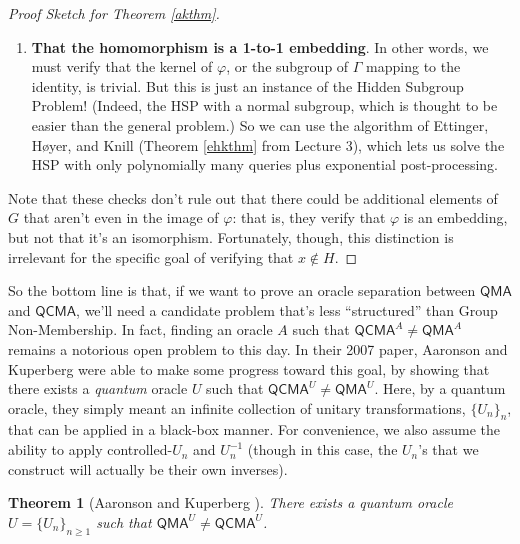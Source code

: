 \documentclass[11pt]{report}
\theoremstyle{plain}
\newtheorem{theorem}{Theorem}[section]
\theoremstyle{definition}
\begin{document}
\begin{proof}[Proof Sketch for Theorem \ref{akthm}]
\begin{enumerate}
    \item   \textbf{That the homomorphism is a 1-to-1 embedding}.  In other words, we must verify that the kernel of $\varphi$, or the subgroup of $\Gamma$ mapping to the identity, is trivial.  But this is just an instance of the Hidden Subgroup Problem!  (Indeed, the HSP with a normal subgroup, which is thought to be easier than the general problem.)  So
        we can use the algorithm of Ettinger, H\o yer, and Knill \cite{ehk} (Theorem \ref{ehkthm} from Lecture 3), which lets us solve the HSP with only polynomially many queries plus exponential post-processing.
  \end{enumerate}
  Note that these checks don't rule out that there could be additional elements of $G$ that aren't even in the image of $\varphi$: that is, they verify that $\varphi$ is an embedding, but not that it's an isomorphism.  Fortunately, though, this distinction is irrelevant for the specific goal of verifying that $x\not\in H$.
\end{proof}

So the bottom line is that, if we want to prove an oracle separation between $\mathsf{QMA}$ and $\mathsf{QCMA}$, we'll need a candidate problem that's less ``structured'' than Group Non-Membership.  In fact, finding an oracle $A$ such that $\mathsf{QCMA}^A \neq \mathsf{QMA}^A$ remains a notorious open problem to this day.  In their 2007 paper, Aaronson and Kuperberg \cite{ak} were able to make some progress toward this goal, by showing that there exists a {\em quantum} oracle $U$ such that $\mathsf{QCMA}^U \neq \mathsf{QMA}^U$.  Here, by a quantum oracle, they simply meant an infinite collection of unitary transformations, $\{U_n \}_n$, that can be applied in a black-box manner.  For convenience, we also assume the ability to apply controlled-$U_n$ and $U_n^{-1}$ (though in this case, the $U_n$'s that we construct will actually be their own inverses).

\begin{theorem}[Aaronson and Kuperberg \cite{ak}]
\label{akthm2}
  There exists a quantum oracle $U = \{ U_n \}_{n \geq 1}$ such that $\mathsf{QMA}^U
  \neq \mathsf{QCMA}^U$.
\end{theorem}
\end{document}
